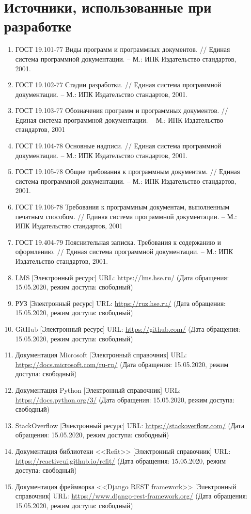 \documentclass{../includes/TechDoc}
\begin{document}
    \section{Источники, использованные при разработке}

    \begin{enumerate}
        \item ГОСТ 19.101-77 Виды программ и программных документов. // Единая система программной документации. – М.: ИПК Издательство стандартов, 2001.
        \item ГОСТ 19.102-77 Стадии разработки. // Единая система программной документации. – М.: ИПК Издательство стандартов, 2001.
        \item ГОСТ 19.103-77 Обозначения программ и программных документов. // Единая система программной документации. – М.: ИПК Издательство стандартов, 2001
        \item ГОСТ 19.104-78 Основные надписи. // Единая система программной документации. – М.: ИПК Издательство стандартов, 2001.
        \item ГОСТ 19.105-78 Общие требования к программным документам. // Единая система программной документации. – М.: ИПК Издательство стандартов, 2001.
        \item ГОСТ 19.106-78 Требования к программным документам, выполненным печатным способом. // Единая система программной документации. – М.: ИПК Издательство стандартов, 2001
        \item ГОСТ 19.404-79 Пояснительная записка. Требования к содержанию и оформлению. // Единая система программной документации. – М.: ИПК Издательство стандартов, 2001.
        \item LMS [Электронный ресурс] URL: \url{https://lms.hse.ru/} (Дата обращения: 15.05.2020, режим доступа: свободный)
        \item РУЗ [Электронный ресурс] URL: \url{https://ruz.hse.ru/} (Дата обращения: 15.05.2020, режим доступа: свободный)
        \item GitHub [Электронный ресурс] URL: \url{https://github.com/} (Дата обращения: 15.05.2020, режим доступа: свободный)
        \item Документация Microsoft [Электронный справочник] URL: \url{https://docs.microsoft.com/ru-ru/} (Дата обращения: 15.05.2020, режим доступа: свободный)
        \item Документация Python [Электронный справочник] URL: \url{https://docs.python.org/3/} (Дата обращения: 15.05.2020, режим доступа: свободный)
        \item StackOverflow [Электронный ресурс] URL: \url{https://stackoverflow.com/} (Дата обращения: 15.05.2020, режим доступа: свободный)
        \item Документация библиотеки <<Refit>> [Электронный справочник] URL: \url{https://reactiveui.github.io/refit/} (Дата обращения: 15.05.2020, режим доступа: свободный)
        \item Документация фреймворка <<Django REST framework>> [Электронный справочник] URL: \url{https://www.django-rest-framework.org/} (Дата обращения: 15.05.2020, режим доступа: свободный)
    \end{enumerate}

    \registrationList
\end{document}

